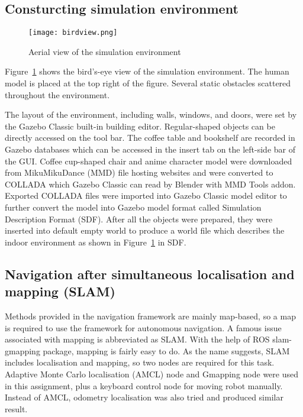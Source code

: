 \subsection{Consturcting simulation environment}

\begin{figure}[htbp]
   \centering
   \texttt{[image: birdview.png]}
   \caption{Aerial view of the simulation environment}
   \label{fig:birdview}
\end{figure}

Figure~\ref{fig:birdview} shows the bird's-eye view of the simulation environment. The human model is placed at the top right of the figure. Several static obstacles scattered throughout the environment.

The layout of the environment, including walls, windows, and doors, were set by the Gazebo Classic built-in building editor. Regular-shaped objects can be directly accessed on the tool bar. The coffee table and bookshelf are recorded in Gazebo databases which can be accessed in the insert tab on the left-side bar of the GUI. Coffee cup-shaped chair and anime character model were downloaded from MikuMikuDance (MMD) file hosting websites and were converted to COLLADA which Gazebo Classic can read by Blender with MMD Tools addon. Exported COLLADA files were imported into Gazebo Classic model editor to further convert the model into Gazebo model format called Simulation Description Format (SDF). After all the objects were prepared, they were inserted into default empty world to produce a world file which describes the indoor environment as shown in Figure~\ref{fig:birdview} in SDF.


\subsection{Navigation after simultaneous localisation and mapping (SLAM)}

Methods provided in the navigation framework are mainly map-based, so a map is required to use the framework for autonomous navigation. A famous issue associated with mapping is abbreviated as SLAM. With the help of ROS slam-gmapping package, mapping is fairly easy to do. As the name suggests, SLAM includes localisation and mapping, so two nodes are required for this task. Adaptive Monte Carlo localisation (AMCL) node and Gmapping node were used in this assignment, plus a keyboard control node for moving robot manually. Instead of AMCL, odometry localisation was also tried and produced similar result.

